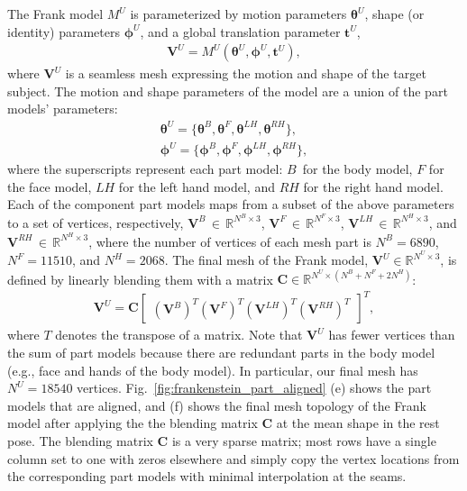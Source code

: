The Frank model $M^U$ is parameterized by motion parameters $\boldsymbol{\theta}^U$, shape (or identity) parameters $\boldsymbol{\phi}^U$, and a global translation parameter $\mathbf{t}^U$,
\begin{align}
\mathbf{V}^U = M^U (\boldsymbol{\theta}^U, \boldsymbol{\phi}^U, \mathbf{t}^U ),
\end{align}
where $\mathbf{V}^U$ is a seamless mesh expressing the motion and shape of the target subject.  The motion and shape parameters of the model are a union of the part models' parameters:
\begin{align}
\boldsymbol{\theta}^U = \{ \boldsymbol{\theta}^B, \boldsymbol{\theta}^F, \boldsymbol{\theta}^{LH}, \boldsymbol{\theta}^{RH}  \}, \\
\boldsymbol{\phi}^U = \{ \boldsymbol{\phi}^B, \boldsymbol{\phi}^F, \boldsymbol{\phi}^{LH},  \boldsymbol{\phi}^{RH}  \},
\end{align}
where the superscripts represent each part model: $B$~for the body model, $F$ for the face model, $LH$ for the left hand model, and $RH$ for the right hand model. Each of the component part models maps from a subset of the above parameters to a set of vertices, respectively, $\mathbf{V}^B \,{\in}\, \mathds{R}^{N^B{\times}3}$, $\mathbf{V}^F \,{\in}\, \mathds{R}^{N^F{\times}3}$, $\mathbf{V}^{LH} \,{\in}\, \mathds{R}^{N^H{\times}3}$, and $\mathbf{V}^{RH} \,{\in}\, \mathds{R}^{N^H{\times}3}$, where the number of vertices of each mesh part is $N^B{=}6890$, $N^F{=}11510$, and $N^H{=}2068$. The final mesh of the Frank model, $\mathbf{V}^U {\in} \mathds{R}^{N^U{\times}3}$, is defined by linearly blending them with a matrix $\mathbf{C} \in \mathds{R}^{N^U\times(N^B{+}N^F{+}2N^H)}$: 
\begin{align}
\mathbf{V}^U = \mathbf{C} 
\left[
\begin{array}{c}
\left({\mathbf{V}^B}\right)^T
\left({\mathbf{V}^F}\right)^T
\left({\mathbf{V}^{LH}}\right)^T
\left({\mathbf{V}^{RH}}\right)^T
\end{array} 
\right]^T,
\end{align}
where $T$ denotes the transpose of a matrix. Note that $\mathbf{V}^U$ has fewer vertices than the sum of part models because there are redundant parts in the body model (e.g., face and hands of the body model). In particular, our final mesh has $N^U{=}18540$ vertices. 
Fig.~\ref{fig:frankenstein_part_aligned} (e) shows the part models that are aligned, and (f) shows the final mesh topology of the Frank model after applying the the blending matrix $\mathbf{C}$ at the mean shape in the rest pose. 
The blending matrix $\mathbf{C}$ is a very sparse matrix; most rows have a single column set to one with zeros elsewhere and simply copy the vertex locations from the corresponding part models with minimal interpolation at the seams.

